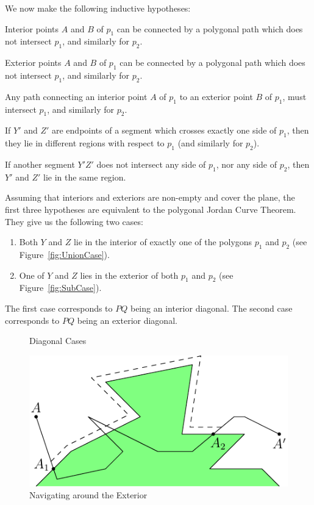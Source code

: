 We now make the following inductive hypotheses:
\begin{description}\label{sec:FirstProofInductiveHypotheses}
\item[IH1] Interior points $A$ and $B$ of $p_1$ can be connected by a polygonal path which does not intersect $p_1$, and similarly for $p_2$.
\item[IH2] Exterior points $A$ and $B$ of $p_1$ can be connected by a polygonal path which does not intersect $p_1$, and similarly for $p_2$.
\item[IH3] Any path connecting an interior point $A$ of $p_1$ to an exterior point $B$ of $p_1$, must intersect $p_1$, and similarly for $p_2$.
\item[IH4] If $Y'$ and $Z'$ are endpoints of a segment which crosses exactly one side of $p_1$, then they lie in different regions with respect to $p_1$ (and similarly for $p_2$).
\item[IH5] If another segment $Y'Z'$ does not intersect any side of $p_1$, nor any side of $p_2$, then $Y'$ and $Z'$ lie in the same region.
\end{description}

Assuming that interiors and exteriors are non-empty and cover the plane, the first three hypotheses are equivalent to the polygonal Jordan Curve Theorem. They give us the following two cases:

\begin{enumerate}
\item Both $Y$ and $Z$ lie in the interior of exactly one of the polygons $p_1$ and $p_2$ (see Figure~\ref{fig:UnionCase}).
\item One of $Y$ and $Z$ lies in the exterior of both $p_1$ and $p_2$ (see Figure~\ref{fig:SubCase}).
\end{enumerate}

The first case corresponds to $PQ$ being an interior diagonal. The second case corresponds to $PQ$ being an exterior diagonal.

\begin{figure}
\centering
{}
\caption{Diagonal Cases}
\label{fig:DiagonalCases}
\end{figure}

\begin{figure}
\centering
\includegraphics{jordan/navigation1.pdf}
\caption{Navigating around the Exterior}
\label{fig:Navigation1}
\end{figure}

